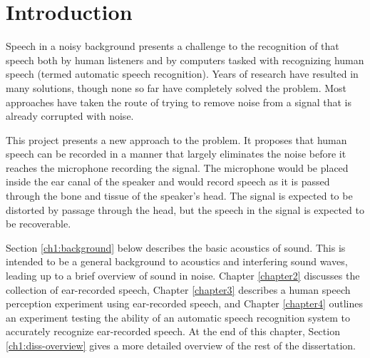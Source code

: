 % 
% 
% 

\chapter{Introduction\label{chapter1}}

Speech in a noisy background presents a challenge to the recognition of that speech both by human listeners and by computers tasked with recognizing human speech (termed automatic speech recognition).  Years of research have resulted in many solutions, though none so far have completely solved the problem.  Most approaches have taken the route of trying to remove noise from a signal that is already corrupted with noise.

This project presents a new approach to the problem.  It proposes that human speech can be recorded in a manner that largely eliminates the noise before it reaches the microphone recording the signal.  The microphone would be placed inside the ear canal of the speaker and would record speech as it is passed through the bone and tissue of the speaker's head.  The signal is expected to be distorted by passage through the head, but the speech in the signal is expected to be recoverable.

Section \ref{ch1:background} below describes the basic acoustics of sound.  This is intended to be a general background to acoustics and interfering sound waves, leading up to a brief overview of sound in noise. Chapter \ref{chapter2} discusses the collection of ear-recorded speech, Chapter \ref{chapter3} describes a human speech perception experiment using ear-recorded speech, and Chapter \ref{chapter4} outlines an experiment testing the ability of an automatic speech recognition system to accurately recognize ear-recorded speech.  At the end of this chapter, Section \ref{ch1:diss-overview} gives a more detailed overview of the rest of the dissertation.

